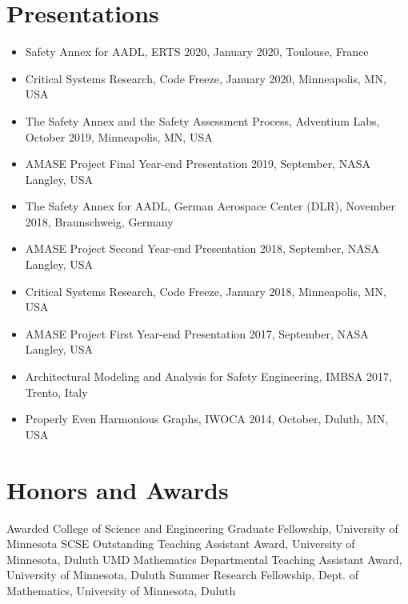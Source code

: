 \documentclass[11pt,a4paper,sans]{moderncv}        %
\begin{document}
\section{\textbf{Presentations}}
\begin{itemize}
\item Safety Annex for AADL, ERTS 2020, January 2020, Toulouse, France
\item Critical Systems Research, Code Freeze, January 2020, Minneapolis, MN, USA
\item The Safety Annex and the Safety Assessment Process, Adventium Labs, October 2019, Minneapolis, MN, USA
\item AMASE Project Final Year-end Presentation 2019, September, NASA Langley, USA
\item The Safety Annex for AADL, German Aerospace Center (DLR), November 2018, Braunschweig, Germany
\item AMASE Project Second Year-end Presentation 2018, September, NASA Langley, USA
\item Critical Systems Research, Code Freeze, January 2018, Minneapolis, MN, USA
\item AMASE Project First Year-end Presentation 2017, September, NASA Langley, USA
\item Architectural Modeling and Analysis for Safety Engineering, IMBSA 2017, Trento, Italy
\item  Properly Even Harmonious Graphs, IWOCA 2014, October, Duluth, MN, USA
\end{itemize}



\section{Honors and Awards}
 {Awarded College of Science and Engineering Graduate Fellowship, University of Minnesota}
 {SCSE Outstanding Teaching Assistant Award, University of Minnesota, Duluth}
 {UMD Mathematics Departmental Teaching Assistant Award, University of Minnesota, Duluth}
 {Summer Research Fellowship, Dept. of Mathematics, University of Minnesota, Duluth}
\end{document}

